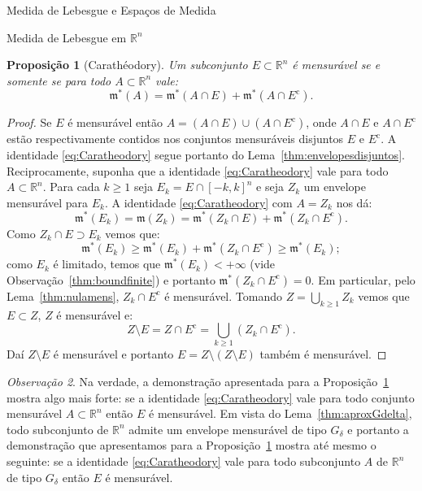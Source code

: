 \documentclass[oneside,final,11pt]{amsbook}
\newcommand{\R}{\mathds R}
\newcommand{\leb}{\mathfrak m}
\newcommand{\compl}{\mathrm c}
\theoremstyle{remark}\newtheorem{exercise}{Exercício}[chapter]
\theoremstyle{remark}\newtheorem{*exercise}[exercise]{\hbox to 0pt{\hskip 0pt minus 1fil*}Exercício}
\theoremstyle{definition}\newtheorem{exdefin}{Definição}[chapter]
\theoremstyle{plain}\newtheorem{teo}{Teorema}[section]
\theoremstyle{plain}\newtheorem{lem}[teo]{Lema}
\theoremstyle{plain}\newtheorem{prop}[teo]{Proposição}
\theoremstyle{plain}\newtheorem{cor}[teo]{Corolário}
\theoremstyle{definition}\newtheorem{defin}[teo]{Definição}
\theoremstyle{remark}\newtheorem{rem}[teo]{Observação}
\theoremstyle{definition}\newtheorem{notation}[teo]{Notação}
\theoremstyle{definition}\newtheorem{convention}[teo]{Convenção}
\theoremstyle{definition}\newtheorem{example}[teo]{Exemplo}
\numberwithin{section}{chapter}
\numberwithin{equation}{section}
\begin{document}
\begin{chapter}{Medida de Lebesgue e Espaços de Medida}
\begin{section}[Medida de Lebesgue em $\R^n$]{Medida de Lebesgue em ${\R^n}$}
\begin{prop}[Carathéodory]\label{thm:Caratheodory}
Um subconjunto $E\subset\R^n$ é mensurável se e somente se para todo $A\subset\R^n$ vale:
\begin{equation}\label{eq:Caratheodory}
\leb^*(A)=\leb^*(A\cap E)+\leb^*(A\cap E^\compl).
\end{equation}
\end{prop}
\begin{proof}
Se $E$ é mensurável então $A=(A\cap E)\cup(A\cap E^\compl)$, onde $A\cap E$ e $A\cap E^\compl$ estão respectivamente
contidos nos conjuntos mensuráveis disjuntos $E$ e $E^\compl$. A identidade \eqref{eq:Caratheodory} segue portanto do Lema~\ref{thm:envelopesdisjuntos}.
Reciprocamente, suponha que a identidade \eqref{eq:Caratheodory} vale para todo $A\subset\R^n$. Para cada $k\ge1$
seja $E_k=E\cap[-k,k]^n$ e seja $Z_k$ um envelope mensurável para $E_k$. A identidade \eqref{eq:Caratheodory} com
$A=Z_k$ nos dá:
\[\leb^*(E_k)=\leb(Z_k)=\leb^*(Z_k\cap E)+\leb^*(Z_k\cap E^\compl).\]
Como $Z_k\cap E\supset E_k$ vemos que:
\[\leb^*(E_k)\ge\leb^*(E_k)+\leb^*(Z_k\cap E^\compl)\ge\leb^*(E_k);\]
como $E_k$ é limitado, temos que $\leb^*(E_k)<+\infty$ (vide Observação~\ref{thm:boundfinite}) e portanto
$\leb^*(Z_k\cap E^\compl)=0$. Em particular, pelo Lema~\ref{thm:nulamens}, $Z_k\cap E^\compl$ é mensurável.
Tomando $Z=\bigcup_{k\ge1}Z_k$ vemos que $E\subset Z$, $Z$ é mensurável e:
\[Z\setminus E=Z\cap E^\compl=\bigcup_{k\ge1}(Z_k\cap E^\compl).\]
Daí $Z\setminus E$ é mensurável e portanto $E=Z\setminus(Z\setminus E)$ também é mensurável.
\end{proof}

\begin{rem}
Na verdade, a demonstração apresentada para a Proposição~\ref{thm:Caratheodory} mostra algo mais forte:
se a identidade \eqref{eq:Caratheodory} vale para todo conjunto mensurável $A\subset\R^n$ então $E$ é mensurável.
Em vista do Lema~\ref{thm:aproxGdelta}, todo subconjunto de $\R^n$ admite um envelope mensurável de tipo $G_\delta$
e portanto a demonstração que apresentamos para a Proposição~\ref{thm:Caratheodory} mostra até mesmo o seguinte:
se a identidade \eqref{eq:Caratheodory} vale para todo subconjunto $A$ de $\R^n$ de tipo $G_\delta$ então $E$ é mensurável.
\end{rem}


\end{section}
\end{chapter}
\end{document}
